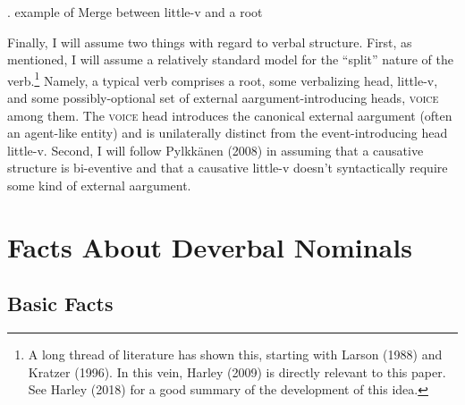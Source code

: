 \documentclass[12pt]{article}
\newcommand*{\textsub}[1]{\ensuremath{_\textrm{{\scriptsize #1}}}}
\begin{document}
\singlespacing

\ex. \label{mergex} example of Merge between little-v and a root

\vspace*{-10pt}
\par\hfill \par

\doublespacing

Finally, I will assume two things with regard to verbal structure. First, as mentioned, I will assume a relatively standard model for the ``split'' nature of the verb.\footnote{ A long thread of literature has shown this, starting with Larson (1988) and Kratzer (1996). In this vein, Harley (2009) is directly relevant to this paper. See Harley (2018) for a good summary of the development of this idea.} Namely, a typical verb comprises a root, some verbalizing head, little-v, and some possibly-optional set of external aargument-introducing heads, \textsc{voice} among them. The \textsc{voice} head introduces the canonical external aargument (often an agent-like entity) and is unilaterally distinct from the event-introducing head little-v. Second, I will follow Pylkk\"{a}nen (2008) in assuming that a causative structure is bi-eventive and that a causative little-v doesn't syntactically require some kind of external aargument.

\section{Facts About Deverbal Nominals}\label{factss}

\subsection{Basic Facts}\label{facts1}
\end{document}
